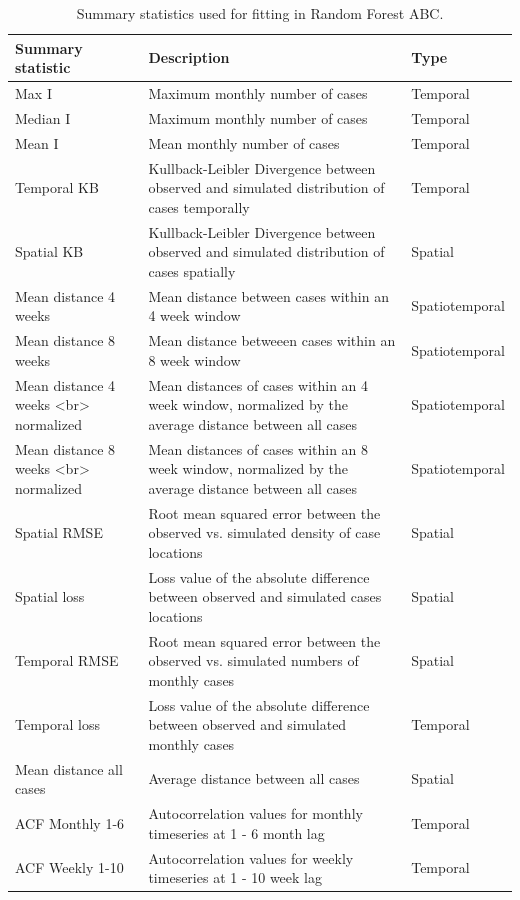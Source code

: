 \documentclass[
]{book}
\begin{document}
\begin{table}

\caption{\label{tab:tbsstats}Summary statistics used for fitting in Random Forest ABC.}
\centering
\begin{tabu} to 
\toprule
Summary statistic & Description & Type\\
\midrule
Max I & Maximum monthly number of cases & Temporal\\
Median I & Maximum monthly number of cases & Temporal\\
Mean I & Mean monthly number of cases & Temporal\\
Temporal KB & Kullback-Leibler Divergence between observed and simulated distribution of cases temporally & Temporal\\
Spatial KB & Kullback-Leibler Divergence between observed and simulated distribution of cases spatially & Spatial\\
\addlinespace
Mean distance 4 weeks & Mean distance between cases within an 4 week window & Spatiotemporal\\
Mean distance 8 weeks & Mean distance betweeen cases within an 8 week window & Spatiotemporal\\
Mean distance 4 weeks <br> normalized & Mean distances of cases within an 4 week window, normalized by the average distance between all cases & Spatiotemporal\\
Mean distance 8 weeks <br> normalized & Mean distances of cases within an 8 week window, normalized by the average distance between all cases & Spatiotemporal\\
Spatial RMSE & Root mean squared error between the observed vs. simulated density of case locations & Spatial\\
\addlinespace
Spatial loss & Loss value of the absolute difference between observed and simulated cases locations & Spatial\\
Temporal RMSE & Root mean squared error between the observed vs. simulated numbers of monthly cases & Spatial\\
Temporal loss & Loss value of the absolute difference between observed and simulated monthly cases & Temporal\\
Mean distance all cases & Average distance between all cases & Spatial\\
ACF Monthly 1-6 & Autocorrelation values for monthly timeseries at 1 - 6 month lag & Temporal\\
\addlinespace
ACF Weekly 1-10 & Autocorrelation values for weekly timeseries at 1 - 10 week lag & Temporal\\
\bottomrule
\end{tabu}
\end{table}
\end{document}
